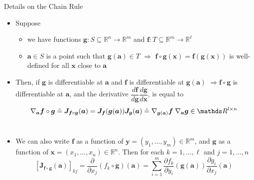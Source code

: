 \documentclass[11pt,compress,t,notes=noshow, xcolor=table]{beamer}
\newcommand{\deriv}{d}
\begin{document}
\begin{frame}[allowframebreaks]{Details on the Chain Rule}
\vspace*{-5pt}
\begin{itemize}
    \item Suppose\begin{itemize}
    \item  we have functions $\boldsymbol{g}: S\subseteq\mathbb{R}^n \rightarrow \mathbb{R}^m$ and $\boldsymbol{f}: T\subseteq\mathbb{R}^m \rightarrow \mathbb{R}^{\ell}$
    \item $\boldsymbol{a} \in S$ is a point such that $\boldsymbol{g}(\boldsymbol{a}) \in T$ $\Rightarrow$ $\boldsymbol{f} \circ \boldsymbol{g}(\boldsymbol{x})=\boldsymbol{f}(\boldsymbol{g}(\boldsymbol{x}))$ is well-defined for all $\boldsymbol{x}$ close to $\boldsymbol{a}$
\end{itemize}
\item Then, if $\boldsymbol{g}$ is differentiable at $\boldsymbol{a}$ and $\boldsymbol{f}$ is differentiable at $\boldsymbol{g}(\boldsymbol{a})$ $\Rightarrow\boldsymbol{f} \circ \boldsymbol{g}$ is differentiable at $\boldsymbol{a}$, and the derivative $\dfrac{\deriv \boldsymbol f}{\deriv \boldsymbol g} \dfrac{\deriv \boldsymbol g}{\deriv \boldsymbol{x}}$, is equal to
\begin{align*}
\nabla_{\boldsymbol{a}} \boldsymbol{f} \circ \boldsymbol{g}\;\hat{=}\;\boldsymbol{J}_{\boldsymbol{f} \circ \boldsymbol{g}}(\boldsymbol{a})=\boldsymbol{J}_{\boldsymbol{f}}(\boldsymbol{g}(\boldsymbol{a}))\boldsymbol{J}_ {\boldsymbol{g}}(\boldsymbol{a})\;\hat{=}\;\nabla_{\boldsymbol{g}(\boldsymbol{a})}{\boldsymbol{f}}\;\nabla_{\boldsymbol{a}} {\boldsymbol{g}}\in\R^{l\times n}
\end{align*}
\\[5pt]

\item We can also write $\boldsymbol{f}$ as a function of $\boldsymbol{y}=\left(y_1, \ldots, y_m\right) \in \mathbb{R}^m$, and $\boldsymbol{g}$ as a function of $\boldsymbol{x}=\left(x_1, \ldots, x_n\right) \in \mathbb{R}^n$. Then for each $k=1, \ldots, \ell$ and $j=1, \ldots, n$
\begin{equation*}
\left[\boldsymbol{J}_{\boldsymbol{f} \circ \boldsymbol{g}}(\boldsymbol{a})\right]_{kj} = \frac{\partial}{\partial x_j}\left(f_k \circ \boldsymbol{g}\right)(\boldsymbol{a})=\sum_{i=1}^m \frac{\partial f_k}{\partial y_i}(\boldsymbol{g}(\boldsymbol{a})) \frac{\partial g_i}{\partial x_j}(\boldsymbol{a})
\end{equation*}
\end{itemize}
\end{frame}
\end{document}
